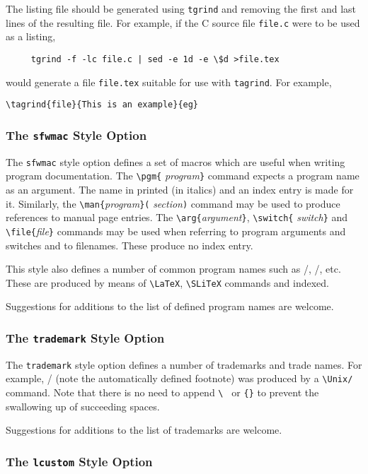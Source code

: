 The listing file should be generated using {\tt tgrind} and removing the first and last lines of the resulting file. For example, if the C source file {\tt file.c} were to be used as a listing,
\begin{verbatim}
     tgrind -f -lc file.c | sed -e 1d -e \$d >file.tex
\end{verbatim}
would generate a file {\tt file.tex} suitable for use
with \verb|tagrind|. For example,
\begin{verbatim}
\tagrind{file}{This is an example}{eg}
\end{verbatim}

\subsubsection{The {\tt sfwmac} Style Option}

The {\tt sfwmac} style option defines a set of macros which are
useful when writing program documentation.  The \verb|\pgm{|{\it
program\/}\verb|}| command expects a program name as an argument.
The name in printed (in italics) and an index entry is made for it.
Similarly, the \verb|\man{|{\it program\/}\verb|}(|{\it
section\/}\verb|)| command may be used to produce references to
manual page entries.
The \verb|\arg{|{\it argument\/}\verb|}|, \verb|\switch{|{\it
switch\/}\verb|}| and \verb|\file{|{\it file\/}\verb|}| commands may be
used when referring to program arguments and switches  and to
filenames. These produce no index entry.

This style also defines a number of common program names such as
\latex/, \slitex/, etc.  These are produced by means of
\verb|\LaTeX|, \verb|\SLiTeX| commands and indexed.  

Suggestions for additions to the list of defined program names are
welcome.

\subsubsection{The {\tt trademark} Style Option}

The {\tt trademark} style option defines a number of trademarks and
trade names.  For example, \Unix/ (note the automatically defined
footnote) was produced by a \verb|\Unix/| command.  Note that there
is no need to append \verb*|\ | or \verb|{}| to prevent the
swallowing up of succeeding spaces.

Suggestions for additions to the list of trademarks are welcome.

\subsubsection{The {\tt lcustom} Style Option}


